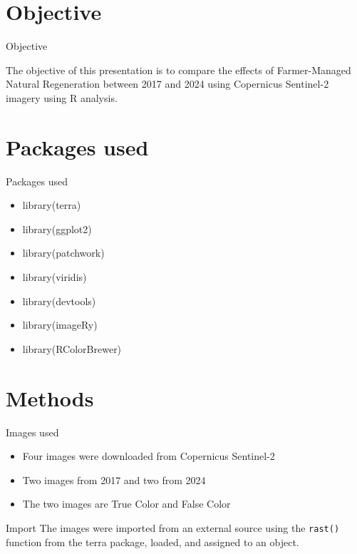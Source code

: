 \documentclass{beamer}
\begin{document}
\section{Objective}

\begin{frame}{Objective}

The objective of this presentation is to compare the effects of Farmer-Managed Natural Regeneration between 2017 and 2024 using Copernicus Sentinel-2 imagery using R analysis.
    
\end{frame}

\section{Packages used}
\begin{frame}{Packages used}
    \begin{itemize}
    
    \item library(terra)
    \item library(ggplot2)
    \item library(patchwork)
    \item library(viridis)
    \item library(devtools)
    \item library(imageRy)
    \item library(RColorBrewer)

\end{itemize}
\end{frame}

\section{Methods}
\begin{frame}{Images used}
\begin{itemize}
    \item Four images were downloaded from Copernicus Sentinel-2
    \item Two images from 2017 and two from 2024
    \item The two images are True Color and False Color 
\end{itemize}
\end{frame}

\begin{frame}{Import}
The images were imported from an external source using the \texttt{rast()} function from the terra package, loaded, and assigned to an object.

      

\end{frame}
\end{document}
